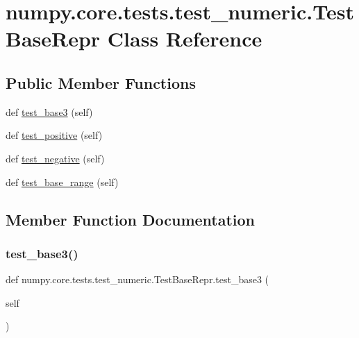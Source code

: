 \hypertarget{classnumpy_1_1core_1_1tests_1_1test__numeric_1_1TestBaseRepr}{}\section{numpy.\+core.\+tests.\+test\+\_\+numeric.\+Test\+Base\+Repr Class Reference}
\label{classnumpy_1_1core_1_1tests_1_1test__numeric_1_1TestBaseRepr}
\subsection*{Public Member Functions}
\begin{DoxyCompactItemize}
\item 
def \hyperlink{classnumpy_1_1core_1_1tests_1_1test__numeric_1_1TestBaseRepr_aca4c4c156d075a25e273abe856db0f3f}{test\+\_\+base3} (self)
\item 
def \hyperlink{classnumpy_1_1core_1_1tests_1_1test__numeric_1_1TestBaseRepr_a2cc8f7facc2abfcc188c21f627280007}{test\+\_\+positive} (self)
\item 
def \hyperlink{classnumpy_1_1core_1_1tests_1_1test__numeric_1_1TestBaseRepr_ac80b62cd9e4d58a40e7accd173831f0a}{test\+\_\+negative} (self)
\item 
def \hyperlink{classnumpy_1_1core_1_1tests_1_1test__numeric_1_1TestBaseRepr_ae44be88c38554adf12fad02472eacc5a}{test\+\_\+base\+\_\+range} (self)
\end{DoxyCompactItemize}


\subsection{Member Function Documentation}
\mbox{\label{classnumpy_1_1core_1_1tests_1_1test__numeric_1_1TestBaseRepr_aca4c4c156d075a25e273abe856db0f3f}} 
\subsubsection{\texorpdfstring{test\+\_\+base3()}{test\_base3()}}
{\footnotesize\ttfamily def numpy.\+core.\+tests.\+test\+\_\+numeric.\+Test\+Base\+Repr.\+test\+\_\+base3 (\begin{DoxyParamCaption}\item[{}]{self }\end{DoxyParamCaption})}

